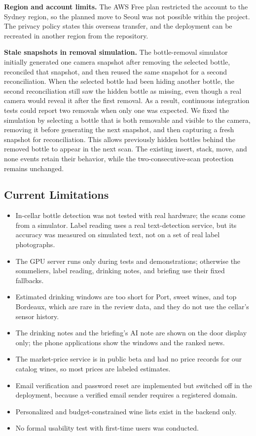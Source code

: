 \documentclass[conference]{IEEEtran}
\begin{document}
\textbf{Region and account limits.} The AWS Free plan restricted the account to the Sydney region, so the planned move to Seoul was not possible within the project. The privacy policy states this overseas transfer, and the deployment can be recreated in another region from the repository.

\textbf{Stale snapshots in removal simulation.} The bottle-removal simulator initially generated one camera snapshot after removing the selected bottle, reconciled that snapshot, and then reused the same snapshot for a second reconciliation. When the selected bottle had been hiding another bottle, the second reconciliation still saw the hidden bottle as missing, even though a real camera would reveal it after the first removal. As a result, continuous integration tests could report two removals when only one was expected. We fixed the simulation by selecting a bottle that is both removable and visible to the camera, removing it before generating the next snapshot, and then capturing a fresh snapshot for reconciliation. This allows previously hidden bottles behind the removed bottle to appear in the next scan. The existing insert, stack, move, and none events retain their behavior, while the two-consecutive-scan protection remains unchanged.

\subsection{Current Limitations}\label{sec:limitations}
\begin{itemize}
    \item In-cellar bottle detection was not tested with real hardware; the scans come from a simulator. Label reading uses a real text-detection service, but its accuracy was measured on simulated text, not on a set of real label photographs.
    \item The GPU server runs only during tests and demonstrations; otherwise the sommeliers, label reading, drinking notes, and briefing use their fixed fallbacks.
    \item Estimated drinking windows are too short for Port, sweet wines, and top Bordeaux, which are rare in the review data, and they do not use the cellar's sensor history.
    \item The drinking notes and the briefing's AI note are shown on the door display only; the phone applications show the windows and the ranked news.
    \item The market-price service is in public beta and had no price records for our catalog wines, so most prices are labeled estimates.
    \item Email verification and password reset are implemented but switched off in the deployment, because a verified email sender requires a registered domain.
    \item Personalized and budget-constrained wine lists exist in the backend only.
    \item No formal usability test with first-time users was conducted.
\end{itemize}
\end{document}
